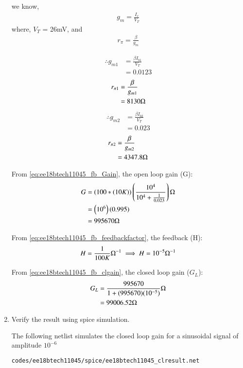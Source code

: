 \begin{enumerate}[label=\arabic*.,ref=\theenumi]
we know, 
\begin{align}
    g_m = \frac{I_{c}}{V_T}
\end{align}
where, $V_T$ = 26mV, and
\begin{align}
    r_{\pi} = \frac{\beta}{g_m}
\end{align}

\begin{align}
    \therefore g_{m1} &= \frac{\beta I_{b1}}{V_T}
    \\
    &= 0.0123
\end{align}
\begin{align}
    r_{\pi 1} &= \frac{\beta}{g_{m1}}
    \\
    &= 8130 \ohm
\end{align}
\begin{align}    
    \therefore g_{m2} &= \frac{\beta I_{b2}}{V_T}
    \\
    &= 0.023
\end{align}
\begin{align}
    r_{\pi 2} &= \frac{\beta}{g_{m2}}
    \\
    &= 4347.8 \ohm
\end{align}

From \eqref{eq:ee18btech11045_fb_Gain}, the open loop gain (G):
\begin{align}
    G &= \left(100*(10K)\right)\left(\frac{10^{4}}{10^{4} + \frac{1}{0.023}}\right) \ohm
    \\
    &= \left(10^{6}\right)\left(0.995\right)
    \\
    &= 995670 \ohm
\end{align}

From \eqref{eq:ee18btech11045_fb_feedbackfactor}, the feedback (H):
\begin{align}
    H = \frac{1}{100K} \ohm^{-1}
    \implies H = 10^{-5} \ohm^{-1}
\end{align}

From \eqref{eq:ee18btech11045_fb_clgain}, the closed loop gain ($G_L$):
\begin{align}
    G_L &= \frac{995670}{1 + (995670)(10^{-5})} \ohm
    \\
    &= 99006.52 \ohm
    \label{ee18btech11045_closedloopgaincl}
\end{align}

\item Verify the result using spice simulation.

\solution

The following netlist simulates the closed loop gain for a sinusoidal signal of amplitude $10^{-6}$
\begin{lstlisting}
codes/ee18btech11045/spice/ee18btech11045_clresult.net
\end{lstlisting}


\end{enumerate}
